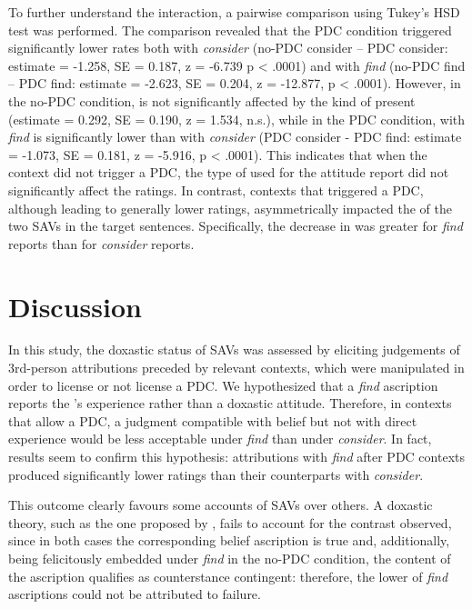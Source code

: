 \documentclass[output=paper,colorlinks,citecolor=brown]{langscibook}
\begin{document}
To further understand the interaction, a pairwise comparison using Tukey’s HSD test was performed. The comparison revealed that the PDC condition triggered significantly lower  rates both with \textit{consider} (no-PDC consider – PDC consider: estimate = -1.258, SE = 0.187, z = -6.739  p < .0001) and with \textit{find} (no-PDC find – PDC find: estimate = -2.623, SE = 0.204, z = -12.877, p < .0001). However, in the no-PDC condition,  is not significantly affected by the kind of  present (estimate = 0.292, SE = 0.190, z = 1.534, n.s.), while in the PDC condition,  with \textit{find} is significantly lower than with \textit{consider} (PDC consider - PDC find: estimate = -1.073, SE = 0.181, z = -5.916, p < .0001). This indicates that when the context did not trigger a PDC, the type of  used for the attitude report did not significantly affect the ratings. In contrast, contexts that triggered a PDC, although leading to generally lower ratings, asymmetrically impacted the  of the two SAVs in the target sentences. Specifically, the decrease in  was greater for \textit{find} reports than for \textit{consider} reports.


\section{Discussion}
\label{sec:discussion:Fusco} 
In this study, the doxastic status of SAVs was assessed by eliciting  judgements of 3rd-person attributions preceded by relevant contexts, which were manipulated in order to license or not license a PDC. We hypothesized that a \textit{find} ascription reports the 's experience rather than a doxastic attitude. Therefore, in contexts that allow a PDC, a judgment compatible with belief but not with direct experience would be less acceptable under \textit{find} than under \textit{consider}. In fact, results seem to confirm this hypothesis: attributions with \textit{find} after PDC contexts produced significantly lower  ratings than their counterparts with \textit{consider}. 

This outcome clearly favours some accounts of SAVs over others. A doxastic theory, such as the one proposed by \citet{kennedy_willer_2022}, fails to account for the contrast observed, since in both cases the corresponding belief ascription is true and, additionally, being felicitously embedded under \textit{find} in the no-PDC condition, the content of the ascription qualifies as counterstance contingent: therefore, the lower  of \textit{find} ascriptions could not be attributed to  failure. 
\end{document}
